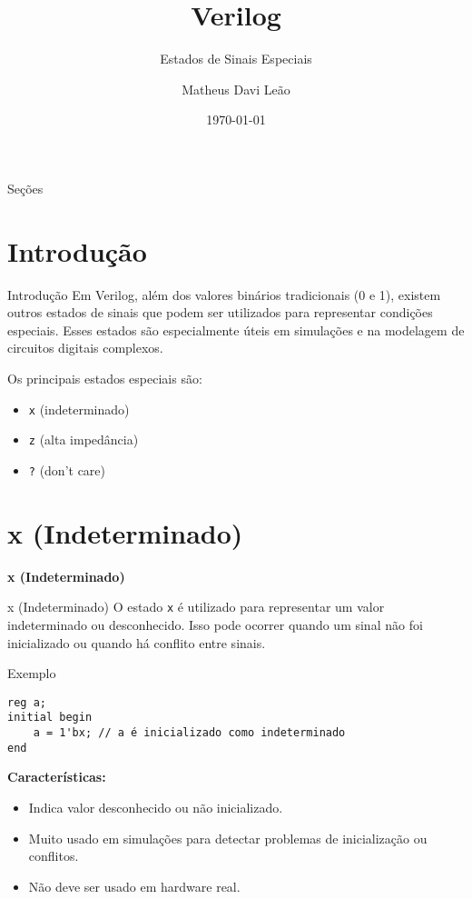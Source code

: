 \documentclass[aspectratio=169,xcolor=dvipsnames]{beamer}
\title{Verilog}
\subtitle{Estados de Sinais Especiais}
\author{Matheus Davi Leão}
\institute
{
    Poliware \\
    Escola Politécnica da Universidade de São Paulo
}
\date{\today}
\begin{document}
\begin{frame}
    \titlepage
\end{frame}

\begin{frame}{Seções}
    \tableofcontents
\end{frame}

\section{Introdução}

\begin{frame}{Introdução}
    Em Verilog, além dos valores binários tradicionais (0 e 1), existem outros estados de sinais que podem ser utilizados para representar condições especiais. Esses estados são especialmente úteis em simulações e na modelagem de circuitos digitais complexos.

    Os principais estados especiais são:
    \begin{itemize}
        \item \texttt{x} (indeterminado)
        \item \texttt{z} (alta impedância)
        \item \texttt{?} (don't care)
    \end{itemize}
\end{frame}

\section{x (Indeterminado)}

\begin{frame}
    \Huge{\centerline{\textbf{x (Indeterminado)}}}
\end{frame}

\begin{frame}[fragile]{x (Indeterminado)}
O estado \texttt{x} é utilizado para representar um valor indeterminado ou desconhecido. Isso pode ocorrer quando um sinal não foi inicializado ou quando há conflito entre sinais.

\begin{block}{Exemplo}
\begin{verbatim}
reg a;
initial begin
    a = 1'bx; // a é inicializado como indeterminado
end
\end{verbatim}
\end{block}

\textbf{Características:}
\begin{itemize}
    \item Indica valor desconhecido ou não inicializado.
    \item Muito usado em simulações para detectar problemas de inicialização ou conflitos.
    \item Não deve ser usado em hardware real.
\end{itemize}
\end{frame}
\end{document}
